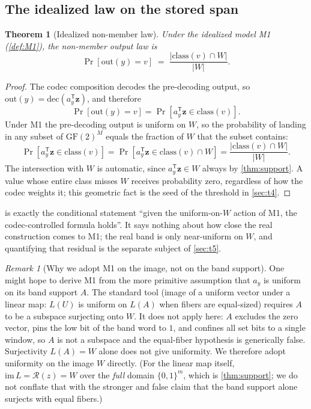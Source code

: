 \documentclass[11pt]{article}
\theoremstyle{definition}
\theoremstyle{plain}
\newtheorem{theorem}{Theorem}[section]
\theoremstyle{remark}
\newtheorem{remark}{Remark}[section]
\newcommand{\dec}{\mathrm{dec}}
\newcommand{\B}{\{0,1\}}
\newcommand{\GF}{\mathrm{GF}(2)}
\newcommand{\class}{\mathrm{class}}
\newcommand{\W}{W}                          %
\newcommand{\Rz}{\mathcal{R}(z)}            %
\newcommand{\bz}{\mathbf{z}}                %
\newcommand{\ay}{a_y}                       %
\newcommand{\inter}{\cap}
\begin{document}
\subsection{The idealized law on the stored span}

\begin{theorem}[Idealized non-member law]
\label{thm:idealized}
Under the idealized model M1 (\cref{def:M1}), the non-member output law is
\begin{equation}
  \Pr[\mathrm{out}(y) = v] \;=\; \frac{|\class(v) \inter \W|}{|\W|}.
  \label{eq:idealized}
\end{equation}
\end{theorem}

\begin{proof}
The codec composition decodes the pre-decoding output, so
$\mathrm{out}(y) = \dec(\ay^{\mathsf T}\bz)$, and therefore
\[
  \Pr[\mathrm{out}(y) = v] = \Pr[\ay^{\mathsf T}\bz \in \class(v)].
\]
Under M1 the pre-decoding output is uniform on $\W$, so the probability of landing in
any subset of $\GF^M$ equals the fraction of $\W$ that the subset contains:
\[
  \Pr[\ay^{\mathsf T}\bz \in \class(v)]
  = \Pr[\ay^{\mathsf T}\bz \in \class(v) \inter \W]
  = \frac{|\class(v) \inter \W|}{|\W|}.
\]
The intersection with $\W$ is automatic, since $\ay^{\mathsf T}\bz \in \W$ always by
\cref{thm:support}. A value whose entire class misses $\W$ receives probability zero,
regardless of how the codec weights it; this geometric fact is the seed of the
threshold in \cref{sec:t4}.
\end{proof}

 is exactly the conditional statement ``given the uniform-on-$\W$
action of M1, the codec-controlled formula holds''. It says nothing about how close
the real construction comes to M1; the real band is only near-uniform on $\W$, and
quantifying that residual is the separate subject of \cref{sec:t5}.

\begin{remark}[Why we adopt M1 on the image, not on the band support]
One might hope to derive M1 from the more primitive assumption that $\ay$ is uniform
on its band support $A$. The standard tool (image of a uniform vector under a linear
map: $L(U)$ is uniform on $L(A)$ when fibers are equal-sized) requires $A$ to be a
subspace surjecting onto $\W$. It does not apply here: $A$ excludes the zero vector,
pins the low bit of the band word to $1$, and confines all set bits to a single
window, so $A$ is not a subspace and the equal-fiber hypothesis is generically false.
Surjectivity $L(A) = \W$ alone does not give uniformity. We therefore adopt uniformity
on the image $\W$ directly. (For the linear map itself, $\mathrm{im}\, L = \Rz = \W$
over the \emph{full} domain $\B^m$, which is \cref{thm:support}; we do not conflate
that with the stronger and false claim that the band support alone surjects with equal
fibers.)
\end{remark}
\end{document}
